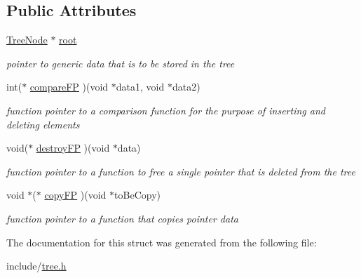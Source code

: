 \subsection*{Public Attributes}
\begin{DoxyCompactItemize}
\item 
\mbox{\label{structBalancedBinTree_a79eb6910645b1a28d977e59b69d89972}} 
\hyperlink{tree_8h_a2215a7c79686526cfed9198a82cb295e}{Tree\+Node} $\ast$ \hyperlink{structBalancedBinTree_a79eb6910645b1a28d977e59b69d89972}{root}
\begin{DoxyCompactList}\small\item\em pointer to generic data that is to be stored in the tree \end{DoxyCompactList}\item 
\mbox{\label{structBalancedBinTree_a6ac05549d1e01bf3011ff1b772b1fc9b}} 
int($\ast$ \hyperlink{structBalancedBinTree_a6ac05549d1e01bf3011ff1b772b1fc9b}{compare\+FP} )(void $\ast$data1, void $\ast$data2)
\begin{DoxyCompactList}\small\item\em function pointer to a comparison function for the purpose of inserting and deleting elements \end{DoxyCompactList}\item 
\mbox{\label{structBalancedBinTree_a6f4f05cf895b0784475b307320c4f746}} 
void($\ast$ \hyperlink{structBalancedBinTree_a6f4f05cf895b0784475b307320c4f746}{destroy\+FP} )(void $\ast$data)
\begin{DoxyCompactList}\small\item\em function pointer to a function to free a single pointer that is deleted from the tree \end{DoxyCompactList}\item 
\mbox{\label{structBalancedBinTree_a91f8d466e1dc38a603e2c85ec925d6e5}} 
void $\ast$($\ast$ \hyperlink{structBalancedBinTree_a91f8d466e1dc38a603e2c85ec925d6e5}{copy\+FP} )(void $\ast$to\+Be\+Copy)
\begin{DoxyCompactList}\small\item\em function pointer to a function that copies pointer data \end{DoxyCompactList}\end{DoxyCompactItemize}


The documentation for this struct was generated from the following file\+:\begin{DoxyCompactItemize}
\item 
include/\hyperlink{tree_8h}{tree.\+h}\end{DoxyCompactItemize}
